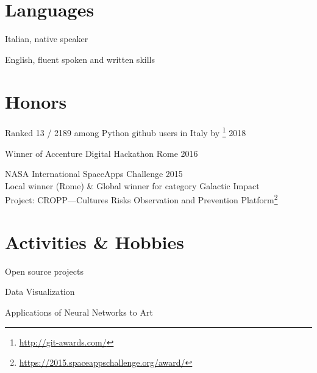 \documentclass[margin]{res}
\begin{document}
\begin{resume}
        \section{Languages}
        \begin{description}
            \item Italian, native speaker
            \item English, fluent spoken and written skills
        \end{description}

        \section{Honors}
        \begin{description}
            \item Ranked 13 / 2189 among Python github users in Italy by \footnote{\url{http://git-awards.com/}} \hfill 2018
            \item Winner of Accenture Digital Hackathon Rome \hfill 2016
            \item NASA International SpaceApps Challenge \hfill 2015\\
                Local winner (Rome) \& Global winner for category Galactic Impact\\
                Project: CROPP---Cultures Risks Observation and Prevention
                Platform\footnote{\url{https://2015.spaceappschallenge.org/award/}}
        \end{description}

        \section{Activities \& Hobbies}
        \begin{description}
            \item Open source projects
            \item Data Visualization
            \item Applications of Neural Networks to Art
        \end{description}
    \end{resume} 
\end{document}
